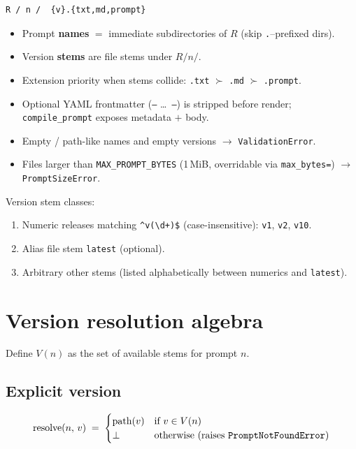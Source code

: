 \documentclass[11pt,a4paper]{article}
\newcommand{\code}[1]{\texttt{#1}}
\newcommand{\botperp}{\bot}
\begin{document}
\begin{lstlisting}
R / n /  {v}.{txt,md,prompt}
\end{lstlisting}

\begin{itemize}[leftmargin=*]
  \item Prompt \textbf{names} $=$ immediate subdirectories of $R$
        (skip \texttt{.}--prefixed dirs).
  \item Version \textbf{stems} are file stems under $R/n/$.
  \item Extension priority when stems collide:
        \texttt{.txt} $\succ$ \texttt{.md} $\succ$ \texttt{.prompt}.
  \item Optional YAML frontmatter (\texttt{---} \ldots\ \texttt{---}) is
        stripped before render; \code{compile\_prompt} exposes metadata $+$ body.
  \item Empty / path-like names and empty versions $\rightarrow$
        \code{ValidationError}.
  \item Files larger than \code{MAX\_PROMPT\_BYTES} (1\,MiB, overridable via
        \code{max\_bytes=}) $\rightarrow$ \code{PromptSizeError}.
\end{itemize}

Version stem classes:
\begin{enumerate}[leftmargin=*]
  \item Numeric releases matching \verb|^v(\d+)$|
        (case-insensitive): \code{v1}, \code{v2}, \code{v10}.
  \item Alias file stem \code{latest} (optional).
  \item Arbitrary other stems (listed alphabetically between numerics and
        \code{latest}).
\end{enumerate}

\section{Version resolution algebra}

Define $V(n)$ as the set of available stems for prompt $n$.

\subsection{Explicit version}

\begin{equation}
  \mathrm{resolve}(n,\, v) \;=\;
  \begin{cases}
    \mathrm{path}(v) & \text{if } v \in V(n) \\
    \botperp         & \text{otherwise (raises \texttt{PromptNotFoundError})}
  \end{cases}
\end{equation}
\end{document}
